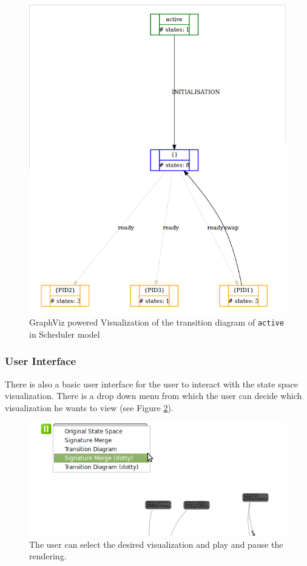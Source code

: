 \begin{center}
\begin{figure}[h!]
\includegraphics[width=14cm]{bilder/transdiag-dotty-wo.png}
\caption{GraphViz powered Visualization of the transition diagram of \texttt{active} in Scheduler model}
\label{transdiagDotty}
\end{figure}
\end{center}

\subsubsection{User Interface} 
There is also a basic user interface for the user to interact with the state space visualization. There is a drop down menu from which the user can decide which visualization he wants to view (see Figure \ref{userSelect}). 

\begin{center}
\begin{figure}[h!]
\includegraphics[width=14cm]{bilder/selectVisualization.png}
\caption{The user can select the desired visualization and play and pause the rendering.}
\label{userSelect}
\end{figure}
\end{center}


